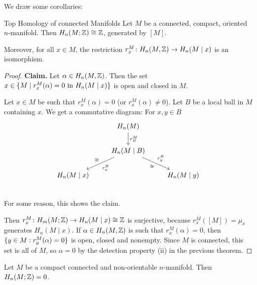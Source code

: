 \documentclass[language=english]{TemplateLecture}
\begin{document}
We draw some corollaries:

\begin{thm}{Top Homology of connected Manifolds}{}
    Let \(M\) be a connected, compact, oriented \(n\)-manifold. Then \(H_n(M; \mathbb{Z}) \cong \mathbb{Z}\), generated by \([M]\).

    Moreover, for all \(x \in M\), the restriction \(r_x^M\colon H_n(M, \mathbb{Z}) \to H_n(M \mid x)\) is an isomorphism.
\end{thm}

\begin{proof}
    \textbf{Claim.} Let \(\alpha\in H_n(M, \mathbb{Z})\). Then the set \(x \in \{M \mid r_x^M(\alpha) = 0 \text{ in } H_n(M \mid x)\}\) is open and closed in \(M\).

    Let \(x \in M\) be such that \(r_x^M(\alpha) = 0\) (or \(r_x^M(\alpha) \neq 0\)). Let \(B\) be a local ball in \(M\) containing \(x\). We get a commutative diagram:
    For \(x,y \in B\)
    \[\begin{tikzcd}
        & H_n(M) \ar[d, "r_B^M"] & \\
        & H_n(M \mid B) \ar[dl, "r_x^B", "\cong"'] \ar[rd, "r_y^B", "\cong"'] & \\
        H_n(M \mid x) && H_n(M \mid y) \\
    \end{tikzcd}\]
    For some reason, this shows the claim.

    Then \(r_x^M \colon H_m(M; \mathbb{Z}) \to H_n(M \mid x) \cong \mathbb{Z}\) is surjective, because \(r_x^M([M]) = \mu_x\) generates \(H_n(M \mid x)\). If \(\alpha \in H_n(M, \mathbb{Z})\) is such that \(r_x^M(\alpha) = 0\), then \(\{y \in M: r_y^M(\alpha) = 0\}\) is open, closed and nonempty. Since \(M\) is connected, this set is all of \(M\), so \(\alpha = 0\) by the detection property (ii) in the previous theorem.
\end{proof}

\begin{corollary}
    Let \(M\) be a compact connected and non-orientable \(n\)-manifold. Then
    \(H_n(M; \mathbb{Z}) = 0\).
\end{corollary}
\end{document}
